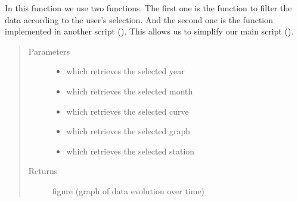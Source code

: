 \documentclass[letterpaper,10pt,english]{sphinxmanual}
\begin{document}
\begin{fulllineitems}
\label{\detokenize{app:update_figure}}
\sphinxAtStartPar
In this function we use two functions. The first one is the  function to filter the data according to the user’s selection. And the second one is the  function implemented in another script (). This allows us to simplify our main script ().
\begin{quote}\begin{description}
\item[{Parameters}] \leavevmode\begin{itemize}
\item {} 
\sphinxAtStartPar
{} \textendash{} which retrieves the selected year

\item {} 
\sphinxAtStartPar
{} \textendash{} which retrieves the selected month

\item {} 
\sphinxAtStartPar
{} \textendash{} which retrieves the selected curve

\item {} 
\sphinxAtStartPar
{} \textendash{} which retrieves the selected graph

\item {} 
\sphinxAtStartPar
{} \textendash{} which retrieves the selected station

\end{itemize}

\item[{Returns}] \leavevmode
\sphinxAtStartPar
figure (graph of data evolution over time)

\end{description}\end{quote}

\end{fulllineitems}
\end{document}
